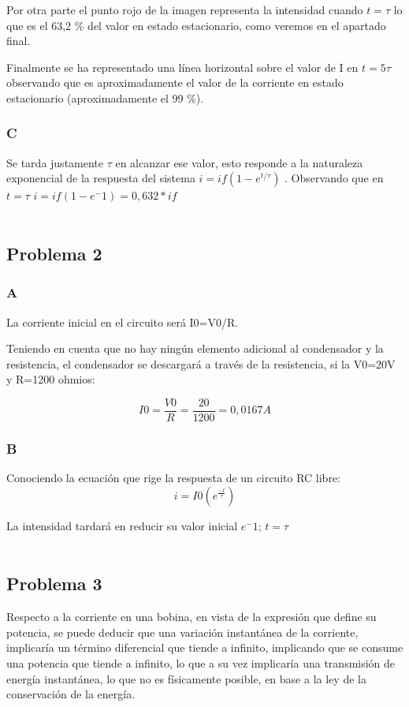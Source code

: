 \documentclass{article}
\begin{document}
Por otra parte el punto rojo de la imagen representa la intensidad cuando $ t = \tau$ lo que es el 63,2 \% del valor en estado estacionario, como veremos en el apartado final.

Finalmente se ha representado una línea horizontal sobre el valor de I en $ t = 5\tau$ observando que es aproximadamente el valor de la corriente en estado estacionario (aproximadamente el 99 \%). 


\subsubsection{C}
Se tarda justamente $\tau$  en alcanzar ese valor, esto responde a la naturaleza exponencial de la respuesta del sistema $ i = if(1- e^{t/\tau} )$ . 
Observando que en $t= \tau$ $i=if(1-e^-1)=0,632*if$
\\
\\

\subsection{Problema 2}
\subsubsection{A}
La corriente inicial en el circuito será I0=V0/R. 

Teniendo en cuenta que no hay ningún elemento adicional al condensador y la resistencia, el condensador se descargará a través de la resistencia, si la V0=20V y R=1200 ohmios:

\[
I0 = \frac{V0}{R}=\frac{20}{1200}=0,0167 A
\]

\subsubsection{B}
Conociendo la ecuación que rige la respuesta de un circuito RC libre: 
\[
i = I0(e^\frac{-t}{\tau})
\]

La intensidad tardará en reducir su valor inicial $e^-1$; $t=\tau$ 
\\
\\

\subsection{Problema 3}
Respecto a la corriente en una bobina, en vista de la expresión que define su potencia, se puede deducir que una variación instantánea de la corriente, implicaría un término diferencial que tiende a infinito, implicando que se consume una potencia que tiende a infinito, lo que a su vez implicaría una transmisión de energía instantánea, lo que no es físicamente posible, en base a la ley de la conservación de la energía.  
\\
\end{document}
